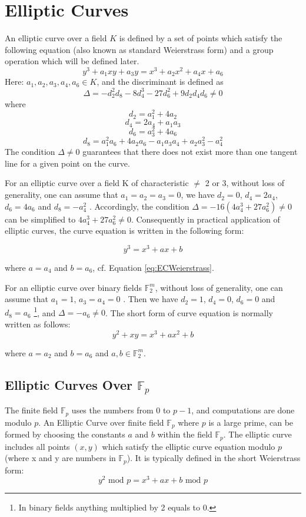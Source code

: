 \section{Elliptic Curves} \label{sec:EC}
An elliptic curve over a field $K$ is defined by a set of points which satisfy the following equation (also known as standard Weierstrass form) and a group operation which will be defined later.
\begin{equation} \label{eq:ECWeierstrass}
y^3+a_1xy+a_3y = x^3 + a_2x^2+a_4x+a_6
\end{equation}
Here: $a_1,a_2,a_3,a_4,a_6 \in K$, and the discriminant is defined as
 $$\Delta=-d^{2}_{2}d_{8}-8d_{4}^{3}-27d_{6}^{2}+9d_{2}d_{4}d_{6} \neq 0$$
where  
$$d_{2}=a_{1}^{2}+4a_{2}$$  $$d_{4}=2a_{4}+a_1a_3$$  $$d_6=a_{3}^{2}+4a_6$$  $$d_8=a_{1}^{2}a_6+4a_2a_6-a_1a_3a_4+a_2a_{3}^{2}-a_{4}^{2}$$
The condition $\Delta \neq 0$ guarantees that there does not exist more than one tangent line for a given point on the curve.

For an elliptic curve over a field K of characteristic $\neq$ 2 or 3, without loss of generality, one can assume that $a_1=a_2=a_3=0$, we have $d_2=0$, $d_4=2a_4$, $d_6 = 4a_6$ and $d_8=-a_{4}^{2}$ \cite{hankerson2006guide}. Accordingly, the condition $\Delta = -16(4a_4^3+27a_6^2) \neq 0$ can be simplified to $4a_4^3+27a_6^2 \neq 0$. Consequently in practical application of elliptic curves, the curve equation is written in the following form:

\begin{equation} \label{eq:ECFp}
y^3=x^3+ax+b
\end{equation}

where $a=a_4$ and $b=a_6$, cf. Equation \ref{eq:ECWeierstrass}.

For an elliptic curve over binary fields $\mathbb{F}_2^m$, without loss of generality, one can assume that $a_1=1$, $a_3=a_4=0$ \cite{hankerson2006guide}. Then we have $d_2=1$, $d_4=0$, $d_6=0$ and $d_8=a_6$ \footnote{In binary fields anything multiplied by 2 equals to 0.}, and $\Delta = -a_6 \neq 0$. The short form of curve equation is normally written as follows: 
\begin{equation}\label{eq:ECF2m}
y^2+xy=x^3+ax^2+b
\end{equation}

where $ a = a_2$ and $b = a_6$ and $a,b \in \mathbb{F}_2^m$. 

\subsection{Elliptic Curves Over $\mathbb{F}_p$}
The finite field $\mathbb{F}_p$ uses the numbers from 0 to $p-1$, and computations are done modulo $p$. An Elliptic Curve over finite field $\mathbb{F}_p$ where $p$ is a large prime, can be formed by choosing the constants $a$ and $b$ within the field $\mathbb{F}_p$. The elliptic curve includes all points $(x,y)$ which satisfy the elliptic curve equation modulo $p$ (where x and y are numbers in $\mathbb{F}_p$). It is typically defined in the short Weierstrass form:
$$y^2 \text{ mod } p= x^3 + ax + b \text{ mod } p$$

